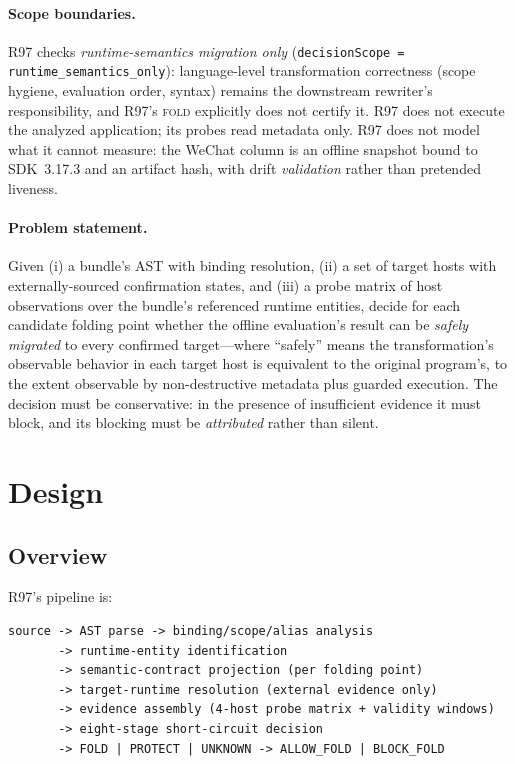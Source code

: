 \documentclass[sigconf,nonacm]{acmart}
\begin{document}
\paragraph{Scope boundaries.} R97 checks \emph{runtime-semantics migration only} (\texttt{decisionScope = runtime\_semantics\_only}): language-level transformation correctness (scope hygiene, evaluation order, syntax) remains the downstream rewriter's responsibility, and R97's \textsc{fold} explicitly does not certify it. R97 does not execute the analyzed application; its probes read metadata only. R97 does not model what it cannot measure: the WeChat column is an offline snapshot bound to SDK~3.17.3 and an artifact hash, with drift \emph{validation} rather than pretended liveness.

\paragraph{Problem statement.} Given (i) a bundle's AST with binding resolution, (ii) a set of target hosts with externally-sourced confirmation states, and (iii) a probe matrix of host observations over the bundle's referenced runtime entities, decide for each candidate folding point whether the offline evaluation's result can be \emph{safely migrated} to every confirmed target---where ``safely'' means the transformation's observable behavior in each target host is equivalent to the original program's, to the extent observable by non-destructive metadata plus guarded execution. The decision must be conservative: in the presence of insufficient evidence it must block, and its blocking must be \emph{attributed} rather than silent.

\section{Design}\label{sec:design}

\subsection{Overview}

R97's pipeline is:

\begin{lstlisting}[caption={R97 pipeline.}, label={lst:pipeline}]
source -> AST parse -> binding/scope/alias analysis
       -> runtime-entity identification
       -> semantic-contract projection (per folding point)
       -> target-runtime resolution (external evidence only)
       -> evidence assembly (4-host probe matrix + validity windows)
       -> eight-stage short-circuit decision
       -> FOLD | PROTECT | UNKNOWN -> ALLOW_FOLD | BLOCK_FOLD
\end{lstlisting}
\end{document}
